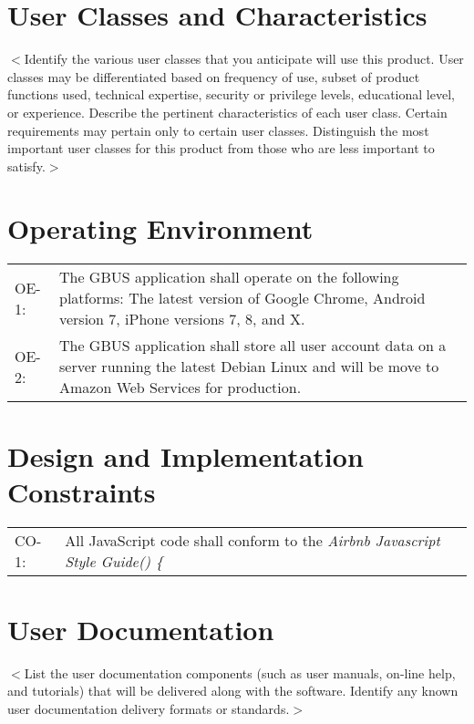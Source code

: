 \documentclass{scrreprt}
\begin{document}
\section{User Classes and Characteristics}
$<$Identify the various user classes that you anticipate will use this product.
User classes may be differentiated based on frequency of use, subset of product
functions used, technical expertise, security or privilege levels, educational
level, or experience. Describe the pertinent characteristics of each user class.
Certain requirements may pertain only to certain user classes. Distinguish the
most important user classes for this product from those who are less important
to satisfy.$>$

\section{Operating Environment}
\begin{center}
\begin{longtable}{ p{1cm} p{14cm} }
OE-1: & The GBUS application shall operate on the following platforms: The latest version of Google Chrome, Android version 7, iPhone versions 7, 8, and X. \\
OE-2: & The GBUS application shall store all user account data on a server running the latest Debian Linux and will be move to Amazon Web Services for production. \\
\end{longtable}
\end{center}

\section{Design and Implementation Constraints}
\begin{center}
\begin{longtable}{ p{2cm} p{13cm} }
CO-1: & All JavaScript code shall conform to the \textit{Airbnb Javascript Style Guide() \{} \\
\end{longtable}
\end{center}

\section{User Documentation}
$<$List the user documentation components (such as user manuals, on-line help,
and tutorials) that will be delivered along with the software. Identify any
known user documentation delivery formats or standards.$>$
\end{document}
